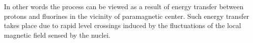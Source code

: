 \documentclass[a4paper, 12pt]{article}
\begin{document}
In other words the process can be viewed as a result of energy transfer between protons and fluorines in the vicinity of paramagnetic center. Such energy transfer takes place due to rapid level crossings induced by the fluctuations of the local magnetic field sensed by the nuclei. 

% 
%
%
\end{document}
